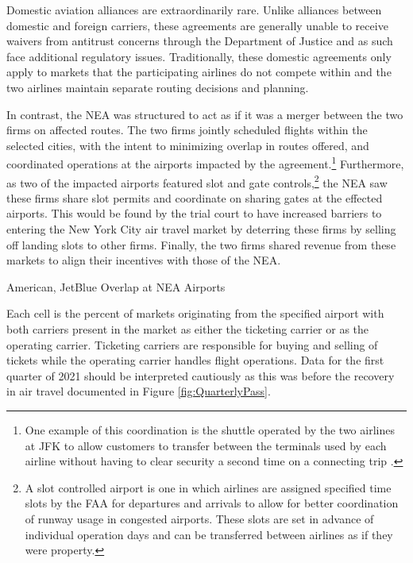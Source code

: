 \documentclass{article}
\begin{document}
	Domestic aviation alliances are extraordinarily rare. Unlike alliances between domestic and foreign carriers, these agreements are generally unable to receive waivers from antitrust concerns through the Department of Justice and as such face additional regulatory issues. Traditionally, these domestic agreements only apply to markets that the participating airlines do not compete within and the two airlines maintain separate routing decisions and planning. 
	
	In contrast, the NEA was structured to act as if it was a merger between the two firms on affected routes. The two firms jointly scheduled flights within the selected cities, with the intent to minimizing overlap in routes offered, and coordinated operations at the airports impacted by the agreement.\footnote{One example of this coordination is the shuttle operated by the two airlines at JFK to allow customers to transfer between the terminals used by each airline without having to clear security a second time on a connecting trip \citep{griff_riding_2021}.} Furthermore, as two of the impacted airports featured slot and gate controls,\footnote{A slot controlled airport is one in which airlines are assigned specified time slots by the FAA for departures and arrivals to allow for better coordination of runway usage in congested airports. These slots are set in advance of individual operation days and can be transferred between airlines as if they were property.} the NEA saw these firms share slot permits and coordinate on sharing gates at the effected airports. This would be found by the trial court to have increased barriers to entering the New York City air travel market by deterring these firms by selling off landing slots to other firms. Finally, the two firms shared revenue from these markets to align their incentives with those of the NEA. 

    \begin{table}[h]
		\caption{American, JetBlue Overlap at NEA Airports}
		\label{tab:NEA_Airport_Prescence}
        \vspace{-15mm}
        \begin{center}
            		
        \end{center}
                \vspace{-5mm}
		\footnotesize{Each cell is the percent of markets originating from the specified airport with both carriers present in the market as either the ticketing carrier or as the operating carrier. Ticketing carriers are responsible for buying and selling of tickets while the operating carrier handles flight operations. Data for the first quarter of 2021 should be interpreted cautiously as this was before the recovery in air travel documented in Figure \ref{fig:QuarterlyPass}.}
	\end{table}
    
\end{document}
